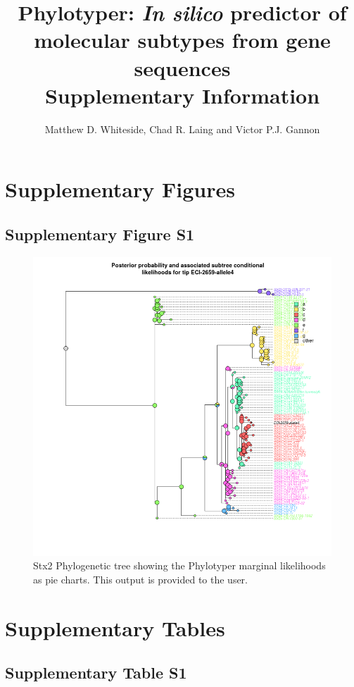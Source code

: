 \documentclass[12pt,letterpaper]{article}
\title{Phylotyper: {\it In silico} predictor of molecular subtypes from gene sequences \\ \large Supplementary Information}
\author{Matthew D. Whiteside, Chad R. Laing and Victor P.J. Gannon}
\date{ }
\begin{document}
 
 
\tableofcontents

\section{Supplementary Figures}

\subsection{Supplementary Figure S1}

\begin{figure}[h!]
\centering
\includegraphics[scale=0.5]{sfig01.png}
\caption{Stx2 Phylogenetic tree showing the Phylotyper marginal likelihoods as pie charts. This output is provided to the user.}
\end{figure}

\clearpage

\section{Supplementary Tables}

\subsection{Supplementary Table S1}
\end{document}

